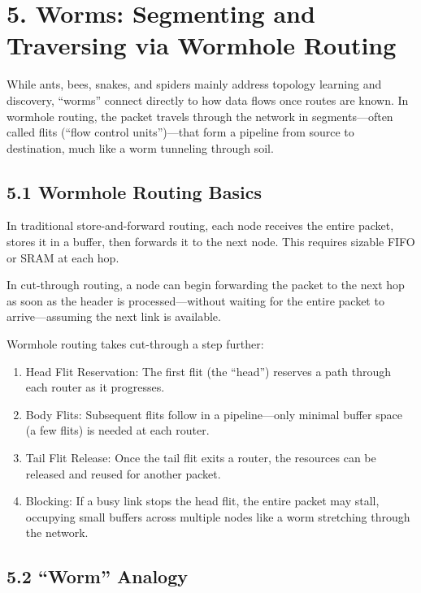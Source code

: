 \documentclass[../../../OAE-SPEC-MAIN.tex]{subfiles}
\begin{document}
\section{5. Worms: Segmenting and Traversing via Wormhole Routing}

While ants, bees, snakes, and spiders mainly address topology learning and discovery, “worms” connect directly to how data flows once routes are known. In wormhole routing, the packet travels through the network in segments—often called flits (“flow control units”)—that form a pipeline from source to destination, much like a worm tunneling through soil.

\subsection{5.1 Wormhole Routing Basics}

In traditional store-and-forward routing, each node receives the entire packet, stores it in a buffer, then forwards it to the next node. This requires sizable FIFO or SRAM at each hop.

In cut-through routing, a node can begin forwarding the packet to the next hop as soon as the header is processed—without waiting for the entire packet to arrive—assuming the next link is available.

Wormhole routing takes cut-through a step further:
\begin{enumerate}
	\item  Head Flit Reservation: The first flit (the “head”) reserves a path through each router as it progresses.
	\item  Body Flits: Subsequent flits follow in a pipeline—only minimal buffer space (a few flits) is needed at each router.
	\item  Tail Flit Release: Once the tail flit exits a router, the resources can be released and reused for another packet.
	\item  Blocking: If a busy link stops the head flit, the entire packet may stall, occupying small buffers across multiple nodes like a worm stretching through the network.
\end{enumerate}




\subsection{5.2 “Worm” Analogy}
\end{document}
